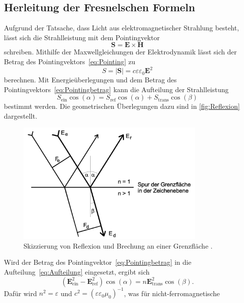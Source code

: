 \subsection{Herleitung der Fresnelschen Formeln}
Aufgrund der Tatsache, dass Licht aus elektromagnetischer Strahlung besteht, lässt sich die 
Strahlleistung mit dem Pointingvektor
\begin{equation}
    \symbf{S} = \symbf{E} \times \symbf{H}
    \label{eq:Pointing}
\end{equation}
schreiben. Mithilfe der Maxwellgleichungen der Elektrodynamik lässt sich der Betrag des 
Pointingvektors~\eqref{eq:Pointing} zu
\begin{equation}
    S = |\symbf{S}| = c \varepsilon \varepsilon_0 \symbf{E}^2
    \label{eq:Pointingbetrag}
\end{equation}
berechnen. Mit Energieüberlegungen und dem Betrag des Pointingvektors~\eqref{eq:Pointingbetrag} kann
die Aufteilung der Strahlleistung 
\begin{equation}
    S_{\text{ein}} \cos(\alpha) = S_{\text{ref}} \cos(\alpha) + S_{\text{trans}} \cos(\beta)
    \label{eq:Aufteilung}
\end{equation}
bestimmt werden. Die geometrischen Überlegungen dazu sind in \autoref{fig:Reflexion} dargestellt.
\begin{figure}[H]
    \centering
    \includegraphics[height=6cm]{content/pics/Reflexion.png}
    \caption{Skizzierung von Reflexion und Brechung an einer Grenzfläche \cite{v407}.}
    \label{fig:Reflexion}
\end{figure}
Wird der Betrag des Pointingvektor~\eqref{eq:Pointingbetrag} in die Aufteilung~\eqref{eq:Aufteilung} 
eingesetzt, ergibt sich
\begin{equation*}
    (\symbf{E}_{\text{ein}}^2 - \symbf{E}_{\text{ref}}^2)\cos(\alpha) = n \symbf{E}_{\text{trans}}^2 \cos(\beta).
\end{equation*}
Dafür wird $n^2=\varepsilon$ und $c^2 = (\varepsilon \varepsilon_0 \mu_0)^{-1}$, was für nicht-ferromagnetische

